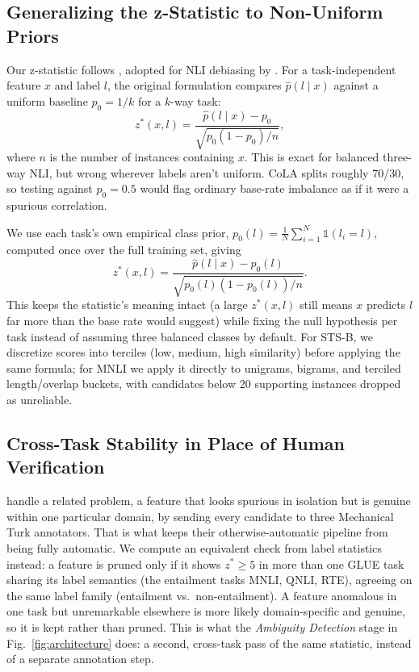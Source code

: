 \documentclass[conference]{IEEEtran}
\begin{document}
\subsection{Generalizing the z-Statistic to Non-Uniform Priors}
\label{sec:zstat}

Our z-statistic follows \cite{gardner2021competency}, adopted for NLI debiasing by \cite{wu2022generating}. For a task-independent feature $x$ and label $l$, the original formulation compares $\hat{p}(l \mid x)$ against a uniform baseline $p_0 = 1/k$ for a $k$-way task:
\begin{equation}
z^*(x, l) = \frac{\hat{p}(l \mid x) - p_0}{\sqrt{p_0(1 - p_0)/n}},
\end{equation}
where $n$ is the number of instances containing $x$. This is exact for balanced three-way NLI, but wrong wherever labels aren't uniform. CoLA splits roughly 70/30, so testing against $p_0 = 0.5$ would flag ordinary base-rate imbalance as if it were a spurious correlation.

We use each task's own empirical class prior, $p_0(l) = \frac{1}{N}\sum_{i=1}^{N} \mathbb{1}(l_i = l)$, computed once over the full training set, giving
\begin{equation}
z^*(x, l) = \frac{\hat{p}(l \mid x) - p_0(l)}{\sqrt{p_0(l)(1 - p_0(l))/n}}.
\end{equation}
This keeps the statistic's meaning intact (a large $z^*(x,l)$ still means $x$ predicts $l$ far more than the base rate would suggest) while fixing the null hypothesis per task instead of assuming three balanced classes by default. For STS-B, we discretize scores into terciles (low, medium, high similarity) before applying the same formula; for MNLI we apply it directly to unigrams, bigrams, and terciled length/overlap buckets, with candidates below 20 supporting instances dropped as unreliable.

\subsection{Cross-Task Stability in Place of Human Verification}
\label{sec:crosstask}

\cite{wang2022identifying} handle a related problem, a feature that looks spurious in isolation but is genuine within one particular domain, by sending every candidate to three Mechanical Turk annotators. That is what keeps their otherwise-automatic pipeline from being fully automatic. We compute an equivalent check from label statistics instead: a feature is pruned only if it shows $z^* \geq 5$ in more than one GLUE task sharing its label semantics (the entailment tasks MNLI, QNLI, RTE), agreeing on the same label family (entailment vs.\ non-entailment). A feature anomalous in one task but unremarkable elsewhere is more likely domain-specific and genuine, so it is kept rather than pruned. This is what the \emph{Ambiguity Detection} stage in Fig.~\ref{fig:architecture} does: a second, cross-task pass of the same statistic, instead of a separate annotation step.
\end{document}
